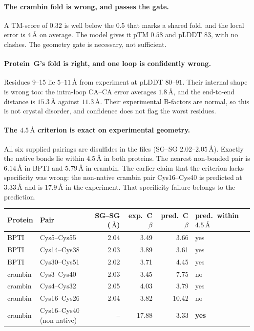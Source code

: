 \documentclass[11pt,a4paper]{article}
\newcommand{\ang}{\,\mbox{\AA}}
\begin{document}
\paragraph{The crambin fold is wrong, and passes the gate.} A TM-score of $0.32$
is well below the $0.5$ that marks a shared fold, and the local error is $4\ang$
on average. The model gives it pTM $0.58$ and pLDDT $83$, with no clashes. The
geometry gate is necessary, not sufficient.

\paragraph{Protein~G's fold is right, and one loop is confidently wrong.}
Residues 9--15 lie $5$--$11\ang$ from experiment at pLDDT $80$--$91$. Their
internal shape is wrong too: the intra-loop CA--CA error averages $1.8\ang$, and
the end-to-end distance is $15.3\ang$ against $11.3\ang$. Their experimental
B-factors are normal, so this is not crystal disorder, and confidence does not
flag the worst residues.

\paragraph{The $4.5\ang$ criterion is exact on experimental geometry.} All six
supplied pairings are disulfides in the files (SG--SG $2.02$--$2.05\ang$). Exactly
the native bonds lie within $4.5\ang$ in both proteins. The nearest non-bonded
pair is $6.14\ang$ in BPTI and $5.79\ang$ in crambin. The earlier claim that the
criterion lacks specificity was wrong: the non-native crambin pair Cys16--Cys40
is predicted at $3.33\ang$ and is $17.9\ang$ in the experiment. That specificity
failure belongs to the prediction.

\begin{center}
\small
\begin{tabular}{@{}llrrrl@{}}
\toprule
Protein & Pair & SG--SG ($\ang$) & exp.\ C$\beta$ & pred.\ C$\beta$ & pred.\ within $4.5\ang$ \\
\midrule
BPTI    & Cys5--Cys55  & 2.04 & 3.49 & 3.66 & yes \\
BPTI    & Cys14--Cys38 & 2.03 & 3.89 & 3.61 & yes \\
BPTI    & Cys30--Cys51 & 2.02 & 3.71 & 4.45 & yes \\
crambin & Cys3--Cys40  & 2.03 & 3.45 & 7.75 & no \\
crambin & Cys4--Cys32  & 2.05 & 4.03 & 3.79 & yes \\
crambin & Cys16--Cys26 & 2.04 & 3.82 & 10.42 & no \\
\midrule
crambin & Cys16--Cys40 (non-native) & -- & 17.88 & 3.33 & \textbf{yes} \\
\bottomrule
\end{tabular}
\end{center}
\end{document}
